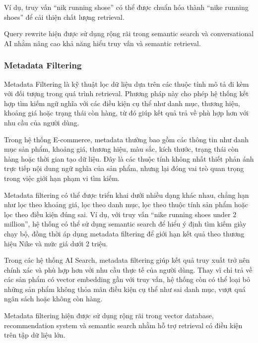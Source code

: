 Ví dụ, truy vấn ``nik running shose'' có thể được chuẩn hóa thành ``nike running shoes'' để cải thiện chất lượng retrieval.

Query rewrite hiện được sử dụng rộng rãi trong semantic search và conversational AI nhằm nâng cao khả năng hiểu truy vấn và semantic retrieval.

\subsubsection{Metadata Filtering}

Metadata Filtering là kỹ thuật lọc dữ liệu dựa trên các thuộc tính mô tả đi kèm với đối tượng trong quá trình retrieval. Phương pháp này cho phép hệ thống kết hợp tìm kiếm ngữ nghĩa với các điều kiện cụ thể như danh mục, thương hiệu, khoảng giá hoặc trạng thái còn hàng, từ đó giúp kết quả trả về phù hợp hơn với nhu cầu của người dùng.

Trong hệ thống E-commerce, metadata thường bao gồm các thông tin như danh mục sản phẩm, khoảng giá, thương hiệu, màu sắc, kích thước, trạng thái còn hàng hoặc thời gian tạo dữ liệu. Đây là các thuộc tính không nhất thiết phản ánh trực tiếp nội dung ngữ nghĩa của sản phẩm, nhưng lại đóng vai trò quan trọng trong việc giới hạn phạm vi tìm kiếm.

Metadata filtering có thể được triển khai dưới nhiều dạng khác nhau, chẳng hạn như lọc theo khoảng giá, lọc theo danh mục, lọc theo thuộc tính sản phẩm hoặc lọc theo điều kiện đúng sai. Ví dụ, với truy vấn ``nike running shoes under 2 million'', hệ thống có thể sử dụng semantic search để hiểu ý định tìm kiếm giày chạy bộ, đồng thời áp dụng metadata filtering để giới hạn kết quả theo thương hiệu Nike và mức giá dưới 2 triệu.

Trong các hệ thống AI Search, metadata filtering giúp kết quả truy xuất trở nên chính xác và phù hợp hơn với nhu cầu thực tế của người dùng. Thay vì chỉ trả về các sản phẩm có vector embedding gần với truy vấn, hệ thống còn có thể loại bỏ những sản phẩm không thỏa mãn điều kiện cụ thể như sai danh mục, vượt quá ngân sách hoặc không còn hàng.

Metadata filtering hiện được sử dụng rộng rãi trong vector database, recommendation system và semantic search nhằm hỗ trợ retrieval có điều kiện trên tập dữ liệu lớn.

